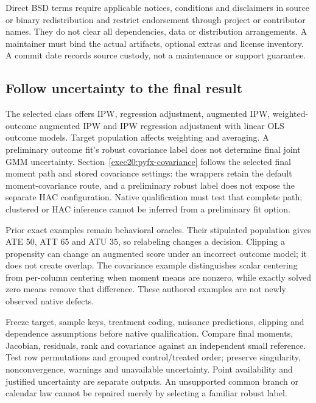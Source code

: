 Direct BSD terms require applicable notices, conditions and disclaimers in source or binary redistribution and restrict endorsement through project or contributor names. They do not clear all dependencies, data or distribution arrangements. A maintainer must bind the actual artifacts, optional extras and license inventory. A commit date records source custody, not a maintenance or support guarantee.~\citep{exec20_python_effect_source,exec24_statsmodels_distribution}

\subsection{Follow uncertainty to the final result}
The selected class offers IPW, regression adjustment, augmented IPW, weighted-outcome augmented IPW and IPW regression adjustment with linear OLS outcome models. Target population affects weighting and averaging. A preliminary outcome fit's robust covariance label does not determine final joint GMM uncertainty. Section~\ref{exec20:pyfx-covariance} follows the selected final moment path and stored covariance settings: the wrappers retain the default moment-covariance route, and a preliminary robust label does not expose the separate HAC configuration. Native qualification must test that complete path; clustered or HAC inference cannot be inferred from a preliminary fit option.~\citep{exec20_python_effect_source}

Prior exact examples remain behavioral oracles. Their stipulated population gives ATE 50, ATT 65 and ATU 35, so relabeling changes a decision. Clipping a propensity can change an augmented score under an incorrect outcome model; it does not create overlap. The covariance example distinguishes scalar centering from per-column centering when moment means are nonzero, while exactly solved zero means remove that difference. These authored examples are not newly observed native defects.~\citep{exec20_python_effect_reference}

Freeze target, sample keys, treatment coding, nuisance predictions, clipping and dependence assumptions before native qualification. Compare final moments, Jacobian, residuals, rank and covariance against an independent small reference. Test row permutations and grouped control/treated order; preserve singularity, nonconvergence, warnings and unavailable uncertainty. Point availability and justified uncertainty are separate outputs. An unsupported common branch or calendar law cannot be repaired merely by selecting a familiar robust label.~\citep{exec20_python_effect_source,exec20_python_effect_reference}

